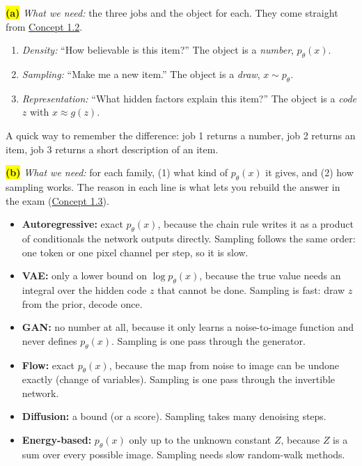 \documentclass[12pt,a4paper]{article}
\begin{document}
\colorbox{yellow}{\textbf{(a)}} \emph{What we need:} the three jobs and the object for each. They come straight from \hyperref[c1-2]{Concept 1.2}.
\begin{enumerate}[nosep]
  \item \emph{Density:} ``How believable is this item?'' The object is a \emph{number}, $p_\theta(x)$.
  \item \emph{Sampling:} ``Make me a new item.'' The object is a \emph{draw}, $x\sim p_\theta$.
  \item \emph{Representation:} ``What hidden factors explain this item?'' The object is a \emph{code} $z$ with $x\approx g(z)$.
\end{enumerate}
A quick way to remember the difference: job 1 returns a number, job 2 returns an item, job 3 returns a short description of an item.

\colorbox{yellow}{\textbf{(b)}} \emph{What we need:} for each family, (1) what kind of $p_\theta(x)$ it gives, and (2) how sampling works. The reason in each line is what lets you rebuild the answer in the exam (\hyperref[c1-3]{Concept 1.3}).
\begin{itemize}[nosep]
  \item \textbf{Autoregressive:} exact $p_\theta(x)$, because the chain rule writes it as a product of conditionals the network outputs directly. Sampling follows the same order: one token or one pixel channel per step, so it is slow.
  \item \textbf{VAE:} only a lower bound on $\log p_\theta(x)$, because the true value needs an integral over the hidden code $z$ that cannot be done. Sampling is fast: draw $z$ from the prior, decode once.
  \item \textbf{GAN:} no number at all, because it only learns a noise-to-image function and never defines $p_\theta(x)$. Sampling is one pass through the generator.
  \item \textbf{Flow:} exact $p_\theta(x)$, because the map from noise to image can be undone exactly (change of variables). Sampling is one pass through the invertible network.
  \item \textbf{Diffusion:} a bound (or a score). Sampling takes many denoising steps.
  \item \textbf{Energy-based:} $p_\theta(x)$ only up to the unknown constant $Z$, because $Z$ is a sum over every possible image. Sampling needs slow random-walk methods.
\end{itemize}
\end{document}
